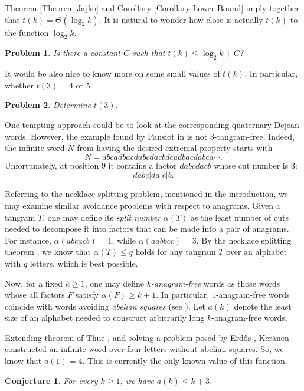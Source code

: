 \documentclass[12pt]{amsart}
\theoremstyle{plain}
\newtheorem{conjecture}{Conjecture}
\newtheorem{problem}{Problem}
\numberwithin{equation}{section}
\begin{document}
Theorem \ref{Theorem Jajko} and Corollary \ref{Corollary Lower Bound} imply together that $t(k)=\Theta(\log_2k)$. It is natural to wonder how close is actually $t(k)$ to the function $\log_2k$.

\begin{problem}
Is there a constant $C$ such that $t(k)\leqslant \log_2k+C$?
\end{problem}

It would be also nice to know more on some small values of $t(k)$. In particular, whether $t(3)=4$ or $5$.

\begin{problem}
	Determine $t(3)$.
\end{problem}

One tempting approach could be to look at the corresponding quaternary Dejean words. However, the example found by Pansiot in \cite{Pan1984} is not $3$-tangram-free. Indeed, the infinite word $N$ from \cite{Pan1984} having the desired extremal property starts with $$N=abcadbacdabcdacbdcadbacdabca\cdots.$$ Unfortunately, at position $9$ it contains a factor $dabcdacb$ whose cut number is $3$: $$dabc|da|c|b.$$

Referring to the necklace splitting problem, mentioned in the introduction, we may examine similar avoidance problems with respect to anagrams. Given a tangram $T$, one may define its \emph{split number} $\alpha(T)$ as the least number of cuts needed to decompose it into factors that can be made into a pair of anagrams. For instance, $\alpha(abcacb)=1$, while $\alpha(aabbcc)=3$. By the necklace splitting theorem \cite{Alon-West,Goldberg-West}, we know that $\alpha(T)\leqslant q$ holds for any tangram $T$ over an alphabet with $q$ letters, which is best possible.

Now, for a fixed $k\geqslant1$, one may define \emph{$k$-anagram-free} words as those words whose all factors $F$ satisfy $\alpha(F)\geqslant k+1$. In particular, $1$-anagram-free words coincide with words avoiding \emph{abelian squares} (see \cite{FiciPuzynina}). Let $a(k)$ denote the least size of an alphabet needed to construct arbitrarily long $k$-anagram-free words.

Extending theorem of Thue \cite{Thue}, and solving a problem posed by Erd\H{o}s \cite{Erdos}, Ker\"{a}nen \cite{Keranen} constructed an infinite word over four letters without abelian squares. So, we know that $a(1)=4$. This is currently the only known value of this function.

\begin{conjecture}
	For every $k\geqslant 1$, we have $a(k)\leqslant k+3$.
\end{conjecture}
\end{document}
